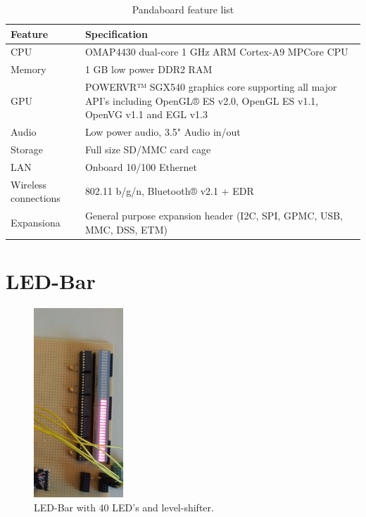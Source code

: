 \begin{table}[h]
\centering
\begin{tabular}{| l |  p{7cm} |}
\hline
\textbf{Feature} & \textbf{Specification} \\ \hline
CPU & OMAP4430 dual-core 1 GHz ARM Cortex-A9 MPCore CPU \\ \hline
Memory & 1 GB low power DDR2 RAM \\ \hline
GPU & POWERVR™ SGX540 graphics core supporting all major API's including OpenGL® ES v2.0, OpenGL ES v1.1, OpenVG v1.1 and EGL v1.3 \\ \hline
Audio & Low power audio, 3.5"  Audio in/out \\ \hline
Storage & Full size SD/MMC card cage \\ \hline
LAN & Onboard 10/100 Ethernet \\ \hline
Wireless connections & 802.11 b/g/n, Bluetooth® v2.1 + EDR \\ \hline
Expansiona & General purpose expansion header (I2C, SPI, GPMC, USB, MMC, DSS, ETM) \\
\hline
\end{tabular}
\caption{Pandaboard feature list}
\label{tab:pandaBoardTable}
\end{table}

\section{LED-Bar}
\begin{figure}[H]
   \centering
   \includegraphics[width=0.3\textwidth]{img/LED-Bar.png}%
   \caption{LED-Bar with 40 LED's and level-shifter.}
   \label{fig:ledBar}%
\end{figure}

